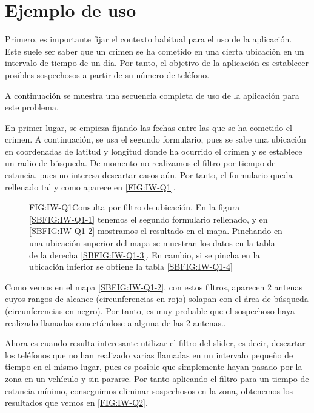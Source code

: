   \section{Ejemplo de uso}
    Primero, es importante fijar el contexto habitual para el uso de la aplicación. Este suele ser saber que un crimen se ha cometido en una cierta ubicación en un intervalo de tiempo de un día. Por tanto, el objetivo de la aplicación es establecer posibles sospechosos a partir de su número de teléfono.
    
    A continuación se muestra una secuencia completa de uso de la aplicación para este problema.
    
    En primer lugar, se empieza fijando las fechas entre las que se ha cometido el crimen. A continuación, se usa el segundo formulario, pues se sabe una ubicación en coordenadas de latitud y longitud donde ha ocurrido el crimen y se establece un radio de búsqueda. De momento no realizamos el filtro por tiempo de estancia, pues no interesa descartar casos aún. Por tanto, el formulario queda rellenado tal y como aparece en \ref{FIG:IW-Q1}.
    
    \begin{figure}[Consulta por filtro de ubicación]{FIG:IW-Q1}{Consulta por filtro de ubicación. En la figura \ref{SBFIG:IW-Q1-1} tenemos el segundo formulario rellenado, y en \ref{SBFIG:IW-Q1-2} mostramos el resultado en el mapa. Pinchando en una ubicación superior del mapa se muestran los datos en la tabla de la derecha \ref{SBFIG:IW-Q1-3}. En cambio, si se pincha en la ubicación inferior se obtiene la tabla \ref{SBFIG:IW-Q1-4}}
       \quad
      \quad
    \end{figure}
  
    Como vemos en el mapa \ref{SBFIG:IW-Q1-2}, con estos filtros, aparecen 2 antenas cuyos rangos de alcance (circunferencias en rojo) solapan con el área de búsqueda (circunferencias en negro). Por tanto, es muy probable que el sospechoso haya realizado llamadas conectándose a alguna de las 2 antenas..
    
    Ahora es cuando resulta interesante utilizar el filtro del slider, es decir, descartar los teléfonos que no han realizado varias llamadas en un intervalo pequeño de tiempo en el mismo lugar, pues es posible que simplemente hayan pasado por la zona en un vehículo y sin pararse. 
    Por tanto aplicando el filtro para un tiempo de estancia mínimo, conseguimos eliminar sospechosos en la zona, obtenemos los resultados que vemos en \ref{FIG:IW-Q2}.
    

